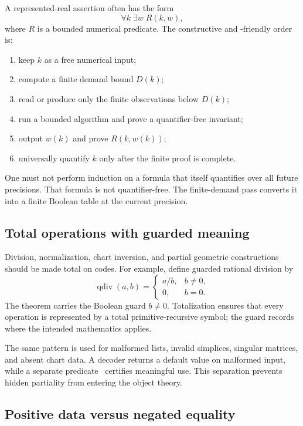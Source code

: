 A represented-real assertion often has the form
\[
  \forall k\; \exists w\; R(k,w),
\]
where $R$ is a bounded numerical predicate.  The constructive and \ipra-friendly order is:

\begin{enumerate}
  \item keep $k$ as a free numerical input;
  \item compute a finite demand bound $D(k)$;
  \item read or produce only the finite observations below $D(k)$;
  \item run a bounded algorithm and prove a quantifier-free invariant;
  \item output $w(k)$ and prove $R(k,w(k))$;
  \item universally quantify $k$ only after the finite proof is complete.
\end{enumerate}

One must not perform induction on a formula that itself quantifies over all future precisions.  That formula is not quantifier-free.  The finite-demand pass converts it into a finite Boolean table at the current precision.

\subsection{Total operations with guarded meaning}

Division, normalization, chart inversion, and partial geometric constructions should be made total on codes.  For example, define guarded rational division by
\[
  \operatorname{qdiv}(a,b)=
  \begin{cases}
    a/b,&b\neq 0,\\
    0,&b=0.
  \end{cases}
\]
The theorem carries the Boolean guard $b\neq0$.  Totalization ensures that every operation is represented by a total primitive-recursive symbol; the guard records where the intended mathematics applies.

The same pattern is used for malformed lists, invalid simplices, singular matrices, and absent chart data.  A decoder returns a default value on malformed input, while a separate predicate \Valid\ certifies meaningful use.  This separation prevents hidden partiality from entering the object theory.

\subsection{Positive data versus negated equality}

